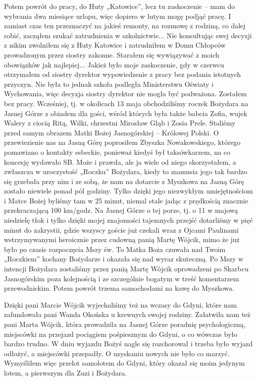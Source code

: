 Potem powrót do pracy, do Huty „Katowice”, lecz tu zaskoczenie – mam do wybrania dwa miesiące urlopu, więc dopiero w lutym mogę podjąć pracę. I zamiast czas ten przeznaczyć na jakieś remonty, na rozmowę z rodziną, co dalej robić, zacząłem szukać zatrudnienia w szkolnictwie... Nie konsultując swej decyzji z nikim zwolniłem się z Huty Katowice i zatrudniłem w Domu Chłopców prowadzonym przez siostry zakonne. Starałem się wywiązywać z moich obowiązków jak najlepiej... Jakież było moje zaskoczenie, gdy w czerwcu otrzymałem od siostry dyrektor wypowiedzenie z pracy bez podania istotnych przyczyn. Nie była to jednak szkoła podległa Ministerstwu Oświaty i Wychowania, więc decyzja siostry dyrektor nie mogła być podważona. Zostałem bez pracy. Wcześniej, tj. w okolicach 13 maja obchodziliśmy roczek Bożydara na Jasnej Górze z obiadem dla gości, wśród których była także babcia Zofia, wujek Walery z ciocią Ritą, Wilki, chrzestni Mirosław Głąb i Zosia Prele. Staliśmy przed samym obrazem Matki Bożej Jasnogórskiej – Królowej Polski. O przewiezienie nas na Jasną Górę poprosiłem Zbyszka Nowakowskiego, którego pomawiano o kontakty esbeckie, ponieważ kiedyś był taksówkarzem, na co koncesję wydawało SB. Może i prawda, ale ja wiele od niego skorzystałem, a zwłaszcza w uroczystość „Roczku” Bożydara, kiedy to mamusia jego tak bardzo się grzebała przy nim i ze sobą, że nam na dotarcie z Myszkowa na Jasną Górę zostało niewiele ponad pół godziny. Tylko dzięki jego niezwykłym umiejętnościom i Matce Bożej byliśmy tam w 25 minut, niemal stale jadąc z prędkością znacznie przekraczającą 100 km/godz. Na Jasnej Górze o tej porze, tj. o 11 w majową niedzielę tłok i tylko dzięki mojej znajomości tajemnych przejść dotarliśmy w pięć minut do zakrystii, gdzie wszyscy goście już czekali wraz z Ojcami Paulinami wstrzymywanymi heroicznie przez cudowną panią Martę Wójcik, mimo że już było po czasie rozpoczęcia Mszy św. To Matka Boża czuwała nad Twoim „Roczkiem” kochany Bożydarze i okazała się nad wyraz skuteczną. Po Mszy w intencji Bożydara zostaliśmy przez panią Martę Wójcik oprowadzeni po Skarbcu Jasnogórskim poza kolejnością i ze szczególnie bogatym w treść komentarzem przewodnickim. Potem powrót trzema samochodami na kawę do Myszkowa.

Dzięki pani Marcie Wójcik wyjechaliśmy też na wczasy do Gdyni, które nam zafundowała pani Wanda Okońska u krewnych swojej rodziny. Załatwiła nam też pani Marta Wójcik, która prowadziła na Jasnej Górze poradnię psychologiczną, miejscówki na przejazd pociągiem pośpiesznym do Gdyni, o co wówczas było bardzo trudno. W dniu wyjazdu Bożyś nagle się rozchorował i trzeba było wyjazd odłożyć, a miejscówki przepadły. O uzyskaniu nowych nie było co marzyć. Wymyśliłem więc przelot samolotem do Gdyni, który okazał się moim jedynym lotem, a pierwszym dla Zuzi i Bożydara.

